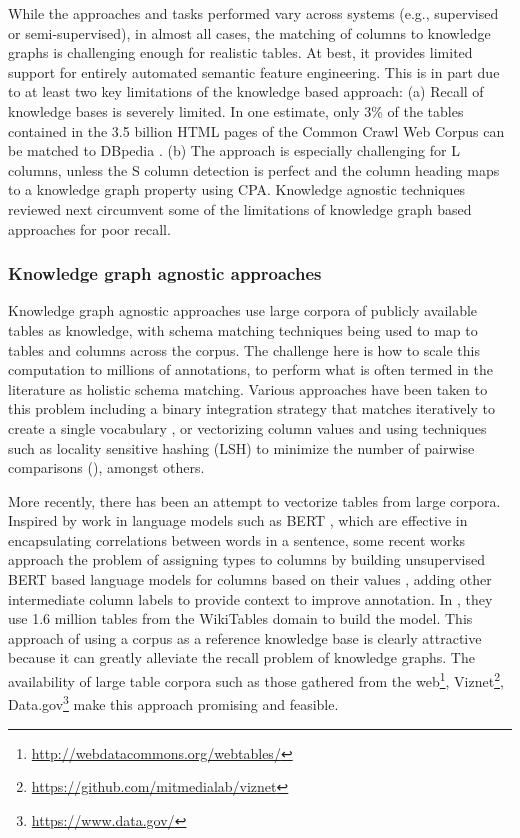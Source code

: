 \documentclass[sigconf]{acmart}
\begin{document}
While the approaches and tasks performed vary across systems (e.g., supervised or semi-supervised), in almost all cases, the matching of columns to knowledge graphs is challenging enough for realistic tables. At best, it provides limited support for entirely automated semantic feature engineering.  This is in part due to at least two key limitations of the knowledge based approach: (a) Recall of knowledge bases is severely limited.  In one estimate, only 3\% of the tables contained in the 3.5 billion HTML pages of the Common Crawl Web Corpus can be matched to
DBpedia \cite{10.1145/2872427.2883017}. (b) The approach is especially challenging for L columns, unless the S column detection is perfect and the column heading maps to a knowledge graph property using CPA.  Knowledge agnostic techniques reviewed next circumvent some of the limitations of knowledge graph based approaches for poor recall.

\subsubsection{Knowledge graph agnostic approaches}
Knowledge graph agnostic approaches use large corpora of publicly available tables as knowledge, with schema matching techniques being used to map to tables and columns across the corpus.  The challenge here is how to scale this computation to millions of annotations, to perform what is often termed in the literature as holistic schema matching. Various approaches have been taken to this problem including a binary integration strategy that matches iteratively to create a single vocabulary \cite{10.1145/27633.27634}, or vectorizing column values and using techniques such as locality sensitive hashing (LSH) to minimize the number of pairwise comparisons (\cite{10.1007/978-3-642-35176-1_4}), amongst others.  

More recently, there has been an attempt to vectorize tables from large corpora.  Inspired by work in language models such as BERT \cite{bert}, which are effective in encapsulating correlations between words in a sentence, some recent works approach the problem of assigning types to columns by building unsupervised BERT based language models for columns based on their values \cite{trabelsi2020semantic}, adding other intermediate column labels to provide context to improve annotation.  In \cite{trabelsi2020semantic}, they use 1.6 million tables from the WikiTables domain to build the model.  This approach of using a corpus as a reference knowledge base is clearly attractive because it can greatly alleviate the recall problem of knowledge graphs. The availability of large table corpora such as those gathered from the web\footnote{\url{http://webdatacommons.org/webtables/}}, Viznet\footnote{\url{https://github.com/mitmedialab/viznet}}, Data.gov\footnote{\url{https://www.data.gov/}} make this approach promising and feasible.
\end{document}
